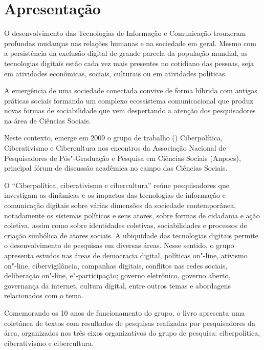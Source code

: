 \chapter*{Apresentação}

O desenvolvimento das Tecnologias de Informação e Comunicação trouxeram
profundas mudanças nas relações humanas e na sociedade em geral. Mesmo
com a persistência da exclusão digital de grande parcela da população
mundial, as tecnologias digitais estão cada vez mais presentes no
cotidiano das pessoas, seja em atividades econômicas, sociais, culturais
ou em atividades políticas.

A emergência de uma sociedade conectada convive de forma híbrida com
antigas práticas sociais formando um complexo ecossistema comunicacional
que produz novas formas de sociabilidade que vem despertando a atenção
dos pesquisadores na área de Ciências Sociais.

Neste contexto, emerge em 2009 o grupo de trabalho () Ciberpolítica,
Ciberativismo e Cibercultura nos encontros da Associação Nacional de
Pesquisadores de Pós"-Graduação e Pesquisa em Ciências Sociais (Anpocs),
principal fórum de discussão acadêmica no campo das Ciências Sociais.

O  ``Ciberpolítica, ciberativismo e cibercultura'' reúne pesquisadores
que investigam as dinâmicas e os impactos das tecnologias de informação
e comunicação digitais sobre várias dimensões da sociedade
contemporânea, notadamente os sistemas políticos e seus atores, sobre
formas de cidadania e ação coletiva, assim como sobre identidades
coletivas, sociabilidades e processos de criação simbólica de atores
sociais. A ubiquidade das tecnologias digitais permite o desenvolvimento
de pesquisas em diversas áreas. Nesse sentido, o grupo apresenta estudos
nas áreas de democracia digital, políticas on"-line, ativismo on"-line,
cibervigilância, campanhas digitais, conflitos nas redes sociais,
deliberação on"-line, e"-participação; governo eletrônico, governo aberto,
governança da internet, cultura digital, entre outros temas e abordagens
relacionados com o tema.

Comemorando os 10 anos de funcionamento do grupo, o livro apresenta uma
coletânea de textos com resultados de pesquisas realizadas por
pesquisadores da área, organizados nos três eixos organizativos do grupo
de pesquisa: ciberpolítica, ciberativismo e cibercultura.

